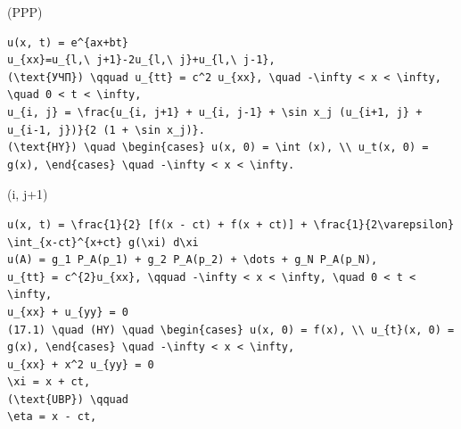 \documentclass[
  ukrainian,
]{article}
\begin{document}
(PPP)

\begin{verbatim}
u(x, t) = e^{ax+bt}
u_{xx}=u_{l,\ j+1}-2u_{l,\ j}+u_{l,\ j-1},
(\text{УЧП}) \qquad u_{tt} = c^2 u_{xx}, \quad -\infty < x < \infty, \quad 0 < t < \infty,
u_{i, j} = \frac{u_{i, j+1} + u_{i, j-1} + \sin x_j (u_{i+1, j} + u_{i-1, j})}{2 (1 + \sin x_j)}.
(\text{HY}) \quad \begin{cases} u(x, 0) = \int (x), \\ u_t(x, 0) = g(x), \end{cases} \quad -\infty < x < \infty.
\end{verbatim}

(i, j+1)

\begin{verbatim}
u(x, t) = \frac{1}{2} [f(x - ct) + f(x + ct)] + \frac{1}{2\varepsilon} \int_{x-ct}^{x+ct} g(\xi) d\xi
u(A) = g_1 P_A(p_1) + g_2 P_A(p_2) + \dots + g_N P_A(p_N),
u_{tt} = c^{2}u_{xx}, \qquad -\infty < x < \infty, \quad 0 < t < \infty,
u_{xx} + u_{yy} = 0
(17.1) \quad (HY) \quad \begin{cases} u(x, 0) = f(x), \\ u_{t}(x, 0) = g(x), \end{cases} \quad -\infty < x < \infty,
u_{xx} + x^2 u_{yy} = 0
\xi = x + ct,
(\text{UBP}) \qquad
\eta = x - ct,
\end{verbatim}
\end{document}
